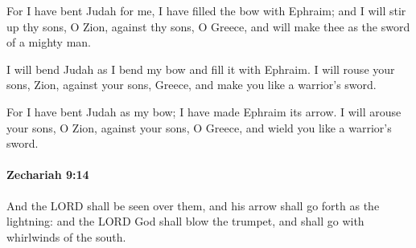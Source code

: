 			\begin{versebox}
					\item[BHS] 
					\item[LXX] 
					\item[ASV] For I have bent Judah for me, I have filled the bow with Ephraim; and I will stir up thy sons, O Zion, against thy sons, O Greece, and will make thee as the sword of a mighty man.
					\item[NIV] I will bend Judah as I bend my bow and fill it with Ephraim. I will rouse your sons, Zion, against your sons, Greece, and make you like a warrior’s sword.
					\item[NRSV] For I have bent Judah as my bow; I have made Ephraim its arrow. I will arouse your sons, O Zion, against your sons, O Greece, and wield you like a warrior’s sword.
			\end{versebox}

		\paragraph{Zechariah 9:14} %
			\label{ZECHARIAH-9-14}

			And the LORD shall be seen over them, and his arrow shall go forth as the lightning: and the LORD God shall blow the trumpet, and shall go with whirlwinds of the south.

